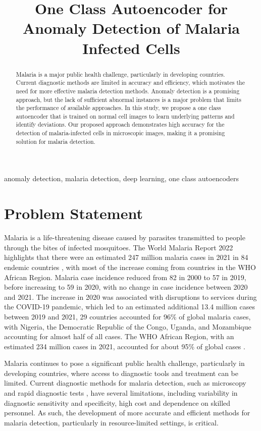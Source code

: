 \documentclass[journal,11pt,onecolumn,draftcls]{IEEEtran}
\begin{document}
\title{One Class Autoencoder for Anomaly Detection of Malaria Infected Cells}
\author{}
\maketitle
\begin{abstract}
    Malaria is a major public health challenge, particularly in developing countries. Current diagnostic methods are limited in accuracy and efficiency, which motivates the need for more effective malaria detection methods. Anomaly detection is a promising approach, but the lack of sufficient abnormal instances is a major problem that limits the performance of available approaches. In this study, we propose a one class autoencoder that is trained on normal cell images to learn underlying patterns and identify deviations. Our proposed approach demonstrates high accuracy for the detection of malaria-infected cells in microscopic images, making it a promising solution for malaria detection.
\end{abstract}

\begin{IEEEkeywords}
anomaly detection, malaria detection, deep learning, one class autoencoders
\end{IEEEkeywords}

\section{Problem Statement}
Malaria is a life-threatening disease caused by parasites transmitted to people through the bites of infected mosquitoes. The World Malaria Report 2022 highlights that there were an estimated 247 million malaria cases in 2021 in 84 endemic countries \cite{who2022}, with most of the increase coming from countries in the WHO African Region. Malaria case incidence reduced from 82 in 2000 to 57 in 2019, before increasing to 59 in 2020, with no change in case incidence between 2020 and 2021. The increase in 2020 was associated with disruptions to services during the COVID-19 pandemic, which led to an estimated additional 13.4 million cases between 2019 and 2021, 29 countries accounted for 96\% of global malaria cases, with Nigeria, the Democratic Republic of the Congo, Uganda, and Mozambique accounting for almost half of all cases. The WHO African Region, with an estimated 234 million cases in 2021, accounted for about 95\% of global cases \cite{who2022}.

Malaria continues to pose a significant public health challenge, particularly in developing countries, where access to diagnostic tools and treatment can be limited. Current diagnostic methods for malaria detection, such as microscopy and rapid diagnostic tests \cite{wilson2012}, have several limitations, including variability in diagnostic sensitivity and specificity, high cost and dependence on skilled personnel. As such, the development of more accurate and efficient methods for malaria detection, particularly in resource-limited settings, is critical.
\end{document}
